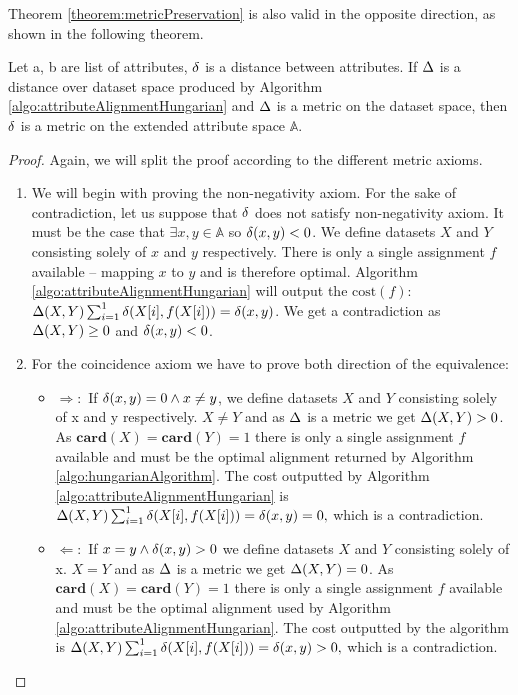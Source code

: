 Theorem \ref{theorem:metricPreservation} is also valid in the opposite direction, as shown in the following theorem.
\begin{theorem}
	\label{theorem:metricRestoration}
	Let a, b are list of attributes, $\delta$ is a distance between attributes. If $\Delta$ is a distance over dataset space produced by Algorithm \ref{algo:attributeAlignmentHungarian} and $\Delta$ is a metric on the dataset space, then $\delta$ is a metric on the extended attribute space $\mathbb{A}$.
	\begin{proof} Again, we will split the proof according to the different metric axioms.
		\begin{enumerate}
			\item We will begin with proving the non-negativity axiom. 	For the sake of contradiction, let us suppose that $\delta$ does not satisfy non-negativity axiom. It must be the case that $\exists x,y \in \mathbb{A}$ so $\delta(x,y) < 0$. We define datasets $X$ and $Y$ consisting solely of $x$ and $y$ respectively. There is only a single assignment $f$ available -- mapping $x$ to $y$ and is therefore optimal. Algorithm \ref{algo:attributeAlignmentHungarian} will output the $\text{cost}(f)$:  $\Delta(X,Y)\sum_{i=1}^{1}\delta(X[i],f(X[i]))=\delta(x,y)$. We get a contradiction as $\Delta(X,Y) \ge 0$ and $\delta(x,y) < 0$.
			\item For the coincidence axiom we have to prove both direction of the equivalence:
			\begin{itemize}
				\item $\Rightarrow:$  If $\delta(x,y)=0 \land x \ne y$, we define datasets $X$ and $Y$ consisting solely of x and y respectively. $X \ne Y$ and as $\Delta$ is a metric we get $\Delta(X,Y) > 0$. As $\mathbf{card} (X) = \mathbf{card} (Y)=1$ there is only a single assignment $f$ available and must be the optimal alignment returned by Algorithm \ref{algo:hungarianAlgorithm}. The cost outputted by Algorithm \ref{algo:attributeAlignmentHungarian} is $\Delta(X,Y)\sum_{i=1}^{1}\delta(X[i],f(X[i]))=\delta(x,y)=0,$ which is a contradiction.
				\item $\Leftarrow:$  If $x=y \land \delta(x,y)>0$  we define datasets $X$ and $Y$ consisting solely of x. $X = Y$ and as $\Delta$ is a metric we get $\Delta(X,Y) = 0$. As $\mathbf{card} (X) = \mathbf{card} (Y)=1$ there is only a single assignment $f$ available and must be the optimal alignment used by Algorithm \ref{algo:attributeAlignmentHungarian}. The cost outputted by the algorithm is $\Delta(X,Y)\sum_{i=1}^{1}\delta(X[i],f(X[i]))=\delta(x,y)>0,$ which is a contradiction.		

\end{itemize}
\end{enumerate}
\end{proof}
\end{theorem}
